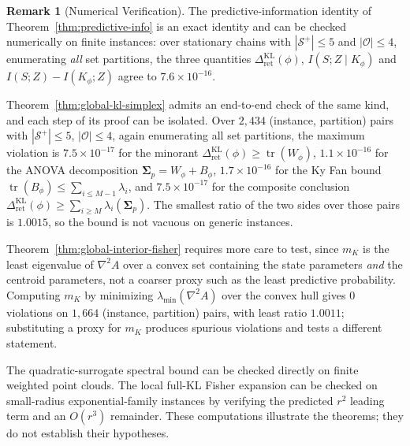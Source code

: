 \documentclass[12pt]{article}
\theoremstyle{definition}
\newtheorem{remark}[theorem]{Remark}
\DeclareMathOperator{\tr}{tr}
\newcommand{\RetKL}{\Delta_{\mathrm{ret}}^{\mathrm{KL}}}
\newcommand{\Splus}{\mathcal S^{+}}
\begin{document}
\begin{remark}[Numerical Verification]
\label{rem:retention-numerical}
The predictive-information identity of Theorem~\ref{thm:predictive-info} is an
exact identity and can be checked numerically on finite instances: over
stationary chains with $|\Splus|\le5$ and $|\mathcal O|\le4$, enumerating
\emph{all} set partitions, the three quantities $\RetKL(\phi)$,
$I(S;Z\mid K_\phi)$ and $I(S;Z)-I(K_\phi;Z)$ agree to $7.6\times10^{-16}$.

Theorem~\ref{thm:global-kl-simplex} admits an end-to-end check of the same
kind, and each step of its proof can be isolated.  Over $2{,}434$
(instance, partition) pairs with $|\Splus|\le5$, $|\mathcal O|\le4$, again
enumerating all set partitions, the maximum violation is
$7.5\times10^{-17}$ for the minorant $\RetKL(\phi)\ge\tr(W_\phi)$,
$1.1\times10^{-16}$ for the ANOVA decomposition
$\bm{\Sigma}_p=W_\phi+B_\phi$, $1.7\times10^{-16}$ for the Ky Fan bound
$\tr(B_\phi)\le\sum_{i\le M-1}\lambda_i$, and $7.5\times10^{-17}$ for the
composite conclusion $\RetKL(\phi)\ge\sum_{i\ge M}\lambda_i(\bm{\Sigma}_p)$.  The
smallest ratio of the two sides over those pairs is $1.0015$, so the bound is
not vacuous on generic instances.

Theorem~\ref{thm:global-interior-fisher} requires more care to test, since
$m_K$ is the least eigenvalue of $\nabla^2A$ over a convex set containing the
state parameters \emph{and} the centroid parameters, not a coarser proxy such
as the least predictive probability.  Computing $m_K$ by minimizing
$\lambda_{\min}(\nabla^2A)$ over the convex hull gives $0$ violations on
$1{,}664$ (instance, partition) pairs, with least ratio $1.0011$; substituting
a proxy for $m_K$ produces spurious violations and tests a different statement.

The quadratic-surrogate spectral bound can be checked directly on finite
weighted point clouds.  The local full-KL Fisher expansion can be checked on
small-radius exponential-family instances by verifying the predicted $r^2$
leading term and an $O(r^3)$ remainder.  These computations illustrate the
theorems; they do not establish their hypotheses.
\end{remark}
\end{document}
